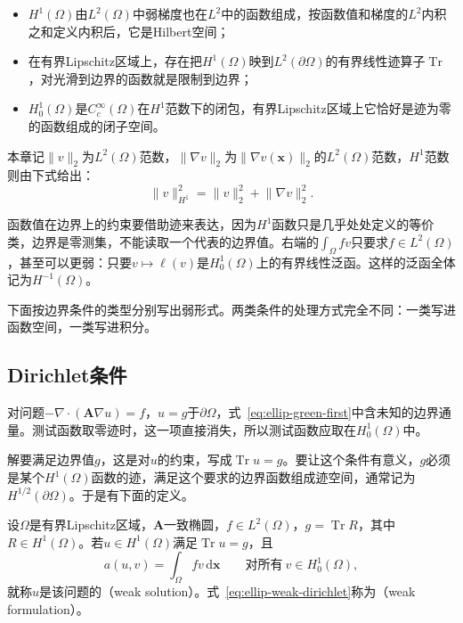 \begin{itemize}
 \item $H^1(\Omega)$由$L^2(\Omega)$中弱梯度也在$L^2$中的函数组成，按函数值和梯度的$L^2$内积之和定义内积后，它是Hilbert空间；
 \item 在有界Lipschitz区域上，存在把$H^1(\Omega)$映到$L^2(\partial\Omega)$的有界线性迹算子$\operatorname{Tr}$，对光滑到边界的函数就是限制到边界；
 \item $H^1_0(\Omega)$是$C_c^\infty(\Omega)$在$H^1$范数下的闭包，有界Lipschitz区域上它恰好是迹为零的函数组成的闭子空间。
\end{itemize}

本章记$\lVert v\rVert_2$为$L^2(\Omega)$范数，$\lVert\nabla v\rVert_2$为$\lVert\nabla v(\bm{x})\rVert_2$的$L^2(\Omega)$范数，$H^1$范数则由下式给出：
\[
 \lVert v\rVert_{H^1}^2=\lVert v\rVert_2^2+\lVert\nabla v\rVert_2^2 .
\]

函数值在边界上的约束要借助迹来表达，因为$H^1$函数只是几乎处处定义的等价类，边界是零测集，不能读取一个代表的边界值。右端的$\int_\Omega fv$只要求$f\in L^2(\Omega)$，甚至可以更弱：只要$v\mapsto\ell(v)$是$H^1_0(\Omega)$上的有界线性泛函。这样的泛函全体记为$H^{-1}(\Omega)$。

下面按边界条件的类型分别写出弱形式。两类条件的处理方式完全不同：一类写进函数空间，一类写进积分。

\subsection{Dirichlet条件}
\label{sec:ellip-weak-dirichlet}

对问题$-\nabla\cdot(\bm{A}\nabla u)=f$，$u=g$于$\partial\Omega$，式~\eqref{eq:ellip-green-first}中含未知的边界通量。测试函数取零迹时，这一项直接消失，所以测试函数应取在$H^1_0(\Omega)$中。

解要满足边界值$g$，这是对$u$的约束，写成$\operatorname{Tr}u=g$。要让这个条件有意义，$g$必须是某个$H^1(\Omega)$函数的迹，满足这个要求的边界函数组成迹空间，通常记为$H^{1/2}(\partial\Omega)$。于是有下面的定义。

\begin{definition}[Dirichlet问题的弱解]
\label{def:ellip-weak-dirichlet}
设$\Omega$是有界Lipschitz区域，$\bm{A}$一致椭圆，$f\in L^2(\Omega)$，$g=\operatorname{Tr}R$，其中$R\in H^1(\Omega)$。若$u\in H^1(\Omega)$满足$\operatorname{Tr}u=g$，且
\begin{equation}
 a(u,v)=\int_\Omega fv\,\mathrm{d}\bm{x}\qquad\text{对所有}\ v\in H^1_0(\Omega),
 \label{eq:ellip-weak-dirichlet}
\end{equation}
就称$u$是该问题的（weak solution）。式~\eqref{eq:ellip-weak-dirichlet}称为（weak formulation）。
\end{definition}

